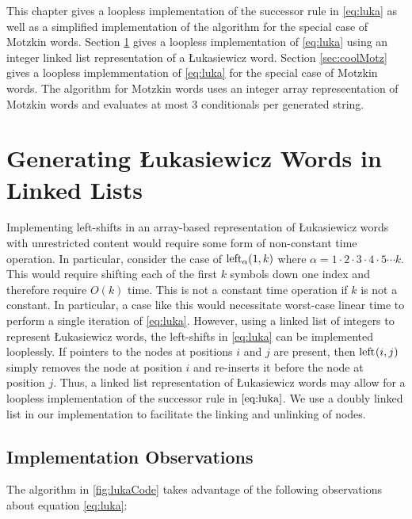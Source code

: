 This chapter gives a loopless implementation of the successor rule in \eqref{eq:luka} as well as a simplified implementation of the algorithm for the special case of Motzkin words. Section \ref{sec:luka_ll} gives a loopless implementation of \eqref{eq:luka} using an integer linked list representation of a Łukasiewicz word. Section \ref{sec:coolMotz} gives a loopless implemmentation of \eqref{eq:luka} for the special case of Motzkin words.  The algorithm for Motzkin words uses an integer array represeentation of Motzkin words and evaluates at most 3 conditionals per generated string. 


\section{Generating Łukasiewicz Words in Linked Lists}\label{sec:luka_ll}
Implementing left-shifts in an array-based representation of Łukasiewicz words with unrestricted content would require some form of non-constant time operation.  In particular, consider the case of $\lshiftindex[\alpha]{1}{k}$ where $\alpha=1\cdot2\cdot3\cdot4\cdot5\cdots k$.  This would require shifting each of the first $k$ symbols down one index and therefore require $O(k)$ time.  This is not a constant time operation if $k$ is not a constant.  In particular, a case like this would necessitate worst-case linear time to perform a single iteration of \eqref{eq:luka}.
However, using a linked list of integers to represent Łukasiewicz words, the left-shifts in \eqref{eq:luka} can be implemented looplessly.  If pointers to the nodes at positions $i$ and $j$ are present, then $\lshiftindex{i}{j}$ simply removes the node at position $i$ and re-inserts it before the node at position $j$.  Thus, a linked list representation of Łukasiewicz words may allow for a loopless implementation of the successor rule in $\eqref{eq:luka}$.  We use a doubly linked list in our implementation to facilitate the linking and unlinking of nodes.

\subsection{Implementation Observations}
The algorithm in \ref{fig:lukaCode} takes advantage of the following observations about equation \eqref{eq:luka}:

